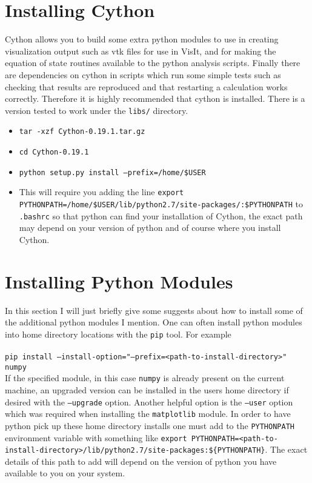 \documentclass[12pt,a4paper]{book}
\begin{document}
\section{Installing Cython}
Cython allows you to build some extra python modules to use in creating visualization output such as vtk files for use in VisIt, and for making the equation of state routines available to the python analysis scripts. Finally there are dependencies on cython in scripts which run some simple tests such as checking that results are reproduced and that restarting a calculation works correctly. Therefore it is highly recommended that cython is installed. There is a version tested to work under the {\tt libs/} directory.
\begin{itemize}
\item {\tt tar -xzf Cython-0.19.1.tar.gz}
\item {\tt cd Cython-0.19.1}
\item {\tt  python setup.py install --prefix=/home/\-\$USER}
\item This will require you adding the  line {\tt export PYTHONPATH\-=/home/\$USER/\-lib/\-python2.7/\-site-packages/\-:\$PYTHONPATH} to {\tt .bashrc} so that python can find your installation of Cython, the exact path may depend on your version of python and of course where you install Cython.
\end{itemize}

\section{Installing Python Modules}
In this section I will just briefly give some suggests about how to install some of the additional python modules I mention. One can often install python modules into home directory locations with the {\tt pip} tool. For example \\
 \\
{\tt pip install --install-option="--prefix=<path-to-install-directory>" numpy}
 \\
If the specified module, in this case {\tt numpy} is already present on the current machine, an upgraded version can be installed in the users home directory if desired with the {\tt --upgrade} option. Another helpful option is the {\tt --user} option which was required when installing the {\tt matplotlib} module. In order to have python pick up these home directory installs one must add to the {\tt PYTHONPATH} environment variable with something like {\tt export PYTHONPATH=<path-to-install-directory>/lib/python2.7/site-packages:\$\{PYTHONPATH\}}. The exact details of this path to add will depend on the version of python you have available to you on your system.
\end{document}
